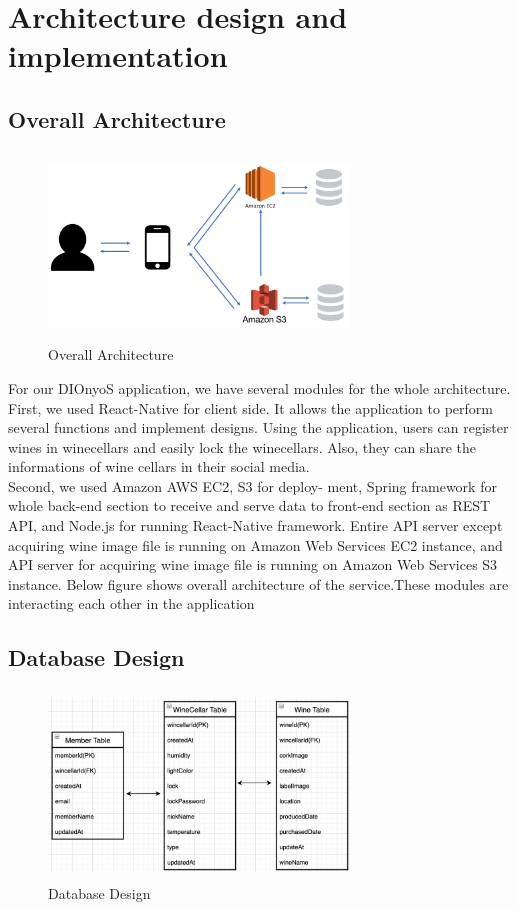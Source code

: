\documentclass[sigconf, nonacm]{acmart}
\begin{document}
\section{Architecture design and implementation}
\subsection{Overall Architecture}
\begin{figure}
  \centering
  \includegraphics[width=8cm, height=5cm]{overallarch.png}
  \caption{Overall Architecture}
  \label{fig:overall arch}
\end{figure}
For our DIOnyoS application, we have several modules
for the whole architecture. First, we used React-Native
for client side. It allows the application to perform several
functions and implement designs. Using the application,
users can register wines in winecellars and easily lock
the winecellars. Also, they can share the informations of
wine cellars in their social media.\\
 Second, we used Amazon AWS EC2, S3 for deploy-
ment, Spring framework for whole back-end section to
receive and serve data to front-end section as REST API,
and Node.js for running React-Native framework. Entire
API server except acquiring wine image file is running
on Amazon Web Services EC2 instance, and API server
for acquiring wine image file is running on Amazon
Web Services S3 instance. Below figure shows overall
architecture of the service.These modules are interacting
each other in the application
\subsection{Database Design}
\begin{figure}
  \centering
  \includegraphics[width=8cm, height=5cm]{database.png}
  \caption{Database Design}
  \label{fig:database design}
\end{figure}
\end{document}
